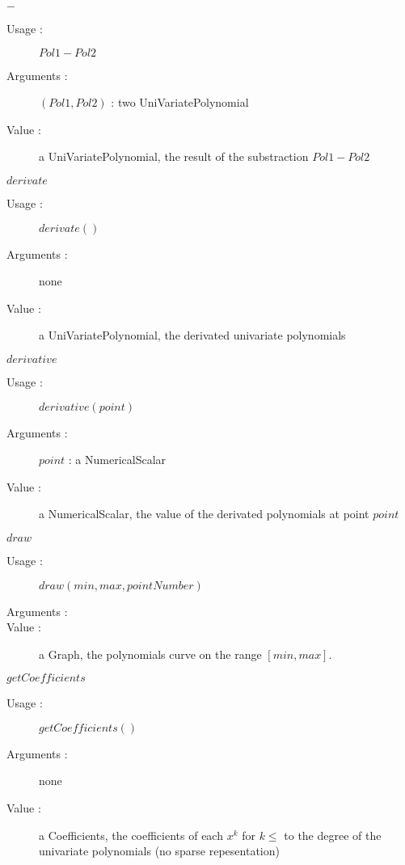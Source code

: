 \begin{description}
\begin{description}
  \item $-$
    \begin{description}
    \item[Usage :]  $Pol1-Pol2$
    \item[Arguments :] $(Pol1, Pol2)$ : two UniVariatePolynomial
    \item[Value :] a UniVariatePolynomial, the result of the substraction  $Pol1-Pol2$
    \end{description}
    \bigskip

  \item $derivate$
    \begin{description}
    \item[Usage :] $derivate()$
    \item[Arguments :] none
    \item[Value :] a UniVariatePolynomial, the derivated univariate polynomials
    \end{description}
    \bigskip

  \item $derivative$
    \begin{description}
    \item[Usage :] $derivative(point)$
    \item[Arguments :] $point$ : a NumericalScalar
    \item[Value :] a NumericalScalar, the value of the derivated polynomials at point $point$
    \end{description}
    \bigskip

  \item $draw$
    \begin{description}
    \item[Usage :] $draw(min, max, pointNumber)$
    \item[Arguments :] \rule{0pt}{1em}
    \item[Value :] a Graph, the polynomials curve on the range $[min, max]$.
    \end{description}

  \item $getCoefficients$
    \begin{description}
    \item[Usage :] $getCoefficients()$
    \item[Arguments :] none
    \item[Value :] a Coefficients, the coefficients of each $x^k$ for $k \leq$ to the degree of the univariate polynomials (no sparse repesentation)
    \end{description}
    \bigskip


\end{description}
\end{description}

